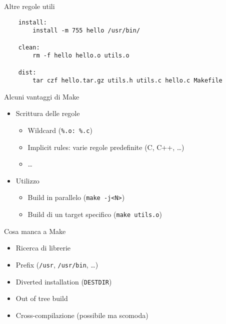 \documentclass[xetex,table]{beamer}
\begin{document}
\begin{frame}[fragile]{Altre regole utili}
  \begin{verbatim}
    install:
        install -m 755 hello /usr/bin/

    clean:
        rm -f hello hello.o utils.o

    dist:
        tar czf hello.tar.gz utils.h utils.c hello.c Makefile
  \end{verbatim}
\end{frame}

\begin{frame}{Alcuni vantaggi di Make}
  \begin{itemize}
  \item Scrittura delle regole
    \begin{itemize}
    \item Wildcard (\texttt{\%.o: \%.c})
    \item Implicit rules: varie regole predefinite (C, C++, \dots)
    \item \dots
    \end{itemize}
  \item Utilizzo
    \begin{itemize}
    \item Build in parallelo (\texttt{make -j<N>})
    \item Build di un target specifico (\texttt{make utils.o})
    \end{itemize}
  \end{itemize}
\end{frame}

\begin{frame}{Cosa manca a Make}
  \begin{itemize}
  \item Ricerca di librerie
  \item Prefix (\texttt{/usr}, \texttt{/usr/bin}, \dots)
  \item Diverted installation (\texttt{DESTDIR})
  \item Out of tree build
  \item Cross-compilazione (possibile ma scomoda)
  \end{itemize}
\end{frame}
\end{document}
